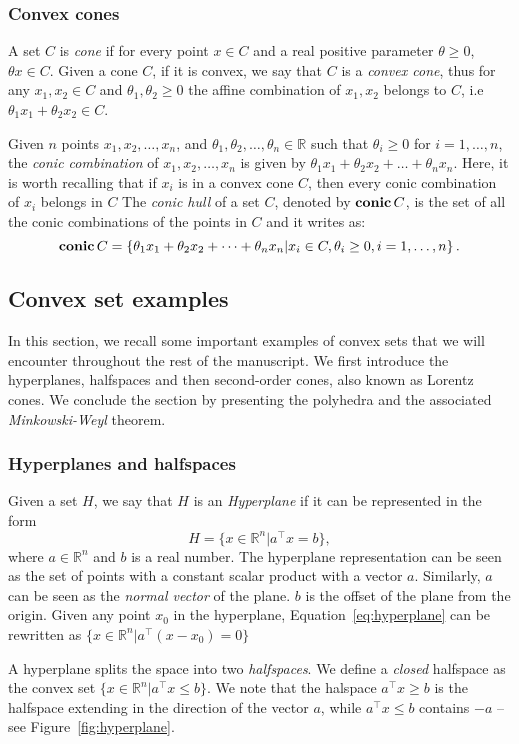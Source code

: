 \subsubsection{Convex cones}
A set $C$ is \emph{cone} if for every point $x \in C$ and a real positive parameter $\theta \ge 0$, $\theta x \in C$. Given a cone $C$, if it is convex, we say that $C$ is a \emph{convex cone}, thus for any $x_1, x_2 \in C$ and $\theta_1, \theta_2 \ge 0$ the affine combination of $x_1, x_2$ belongs to $C$, i.e  $\theta_1 x_1 + \theta_2 x_2 \in C$.
\par
Given $n$ points $x_1, x_2, \dots, x_n$, and $\theta_1, \theta_2, \dots, \theta_n \in \mathbb{R}$ such that $\theta_i \ge 0$ for $i = 1, \dots, n$, the \emph{conic combination} of $x_1, x_2, \dots, x_n$ is given by $\theta_1 x_1 +  \theta_2 x_2 + \dots + \theta_n x_n$. Here, it is worth recalling that if $x_i$ is in a convex cone $C$, then every conic combination of $x_i$ belongs in $C$
The \emph{conic hull} of a set $C$, denoted by $\operatorname*{\textbf{conic}} C$, is the set of all the conic combinations of the points in $C$ and it writes as:
\begin{equation}
    \operatorname*{\textbf{conic}} C = \left\{ \theta_1 x_1 +  \theta_2 x_2 + \dots + \theta_n x_n | x_i \in C, \theta_i \ge 0, i=1,\dots, n\right\}.
\end{equation}

\subsection{Convex set examples\label{sec:convex_set_example}}
In this section, we recall some important examples of convex sets that we will encounter throughout the rest of the manuscript. We first introduce the hyperplanes, halfspaces and then second-order cones, also known as Lorentz cones. We conclude the section by presenting the polyhedra and the associated \emph{Minkowski-Weyl} theorem.

\subsubsection{Hyperplanes and halfspaces}
Given a set $H$, we say that $H$ is an \emph{Hyperplane} if it can be represented in the form 
\begin{equation}
    \label{eq:hyperplane}
    H = \{ x \in \mathbb{R}^n | a^\top x = b \},
\end{equation}
where $a \in \mathbb{R}^n$ and $b$ is a real number. The hyperplane representation can be seen as the set of points with a constant scalar product with a vector $a$. Similarly, $a$ can be seen as the \emph{normal vector} of the plane. $b$ is the offset of the plane from the origin.  Given any point $x_0$ in the hyperplane, Equation~\eqref{eq:hyperplane} can be rewritten as $\{ x \in \mathbb{R}^n | a^\top  ( x - x_0) = 0 \}$
\par
A hyperplane splits the space into two \emph{halfspaces}. We define a \emph{closed} halfspace as the convex set $\{ x \in \mathbb{R}^n | a^\top   x \le  b \}$. We note that the halspace $a^\top   x \ge  b$ is the halfspace extending in the direction of the vector $a$, while $a^\top   x \le  b$ contains $-a$ -- see Figure~\ref{fig:hyperplane}.

